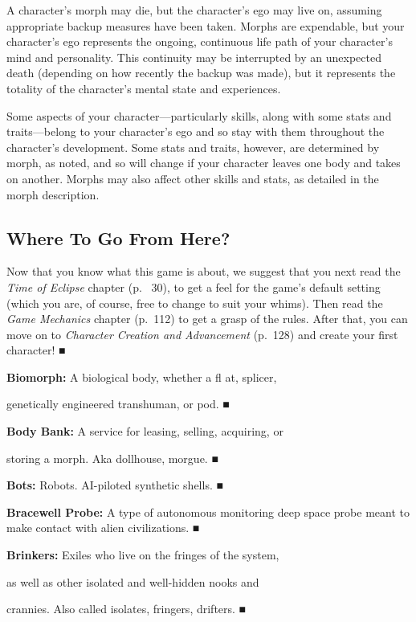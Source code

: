 A character's morph may die, but the character's 
ego may live on, assuming appropriate backup 
measures have been taken. Morphs are expendable, 
but your character's ego represents the ongoing, 
continuous life path of your character's mind and 
personality. This continuity may be interrupted by 
an unexpected death (depending on how recently 
the backup was made), but it represents the totality 
of the character's mental state and experiences.

Some aspects of your character—particularly skills, 
along with some stats and traits—belong to your 
character's ego and so stay with them throughout 
the character's development. Some stats and traits, 
however, are determined by morph, as noted, and so 
will change if your character leaves one body and 
takes on another. Morphs may also affect other skills 
and stats, as detailed in the morph description.

\subsection{Where To Go From Here?}

Now that you know what this game is about, we suggest that you next read the \textit{Time of Eclipse} chapter 
(p.  30), to get a feel for the game's default setting 
(which you are, of course, free to change to suit your 
whims). Then read the \textit{Game Mechanics} chapter 
(p. 112) to get a grasp of the rules. After that, you 
can move on to \textit{Character Creation and Advancement}
(p. 128) and create your first character!
■

\textbf{ Biomorph:} A biological body, whether a ﬂ at, splicer, 

genetically engineered transhuman, or pod.
■

\textbf{ Body Bank:} A service for leasing, selling, acquiring, or 

storing a morph. Aka dollhouse, morgue.
■

\textbf{ Bots:} Robots. AI-piloted synthetic shells.
■

\textbf{ Bracewell Probe:} A type of autonomous monitoring deep
space probe meant to make contact with alien civilizations.
■

\textbf{ Brinkers:} Exiles who live on the fringes of the system, 

as well as other isolated and well-hidden nooks and 

crannies. Also called isolates, fringers, drifters.
■

